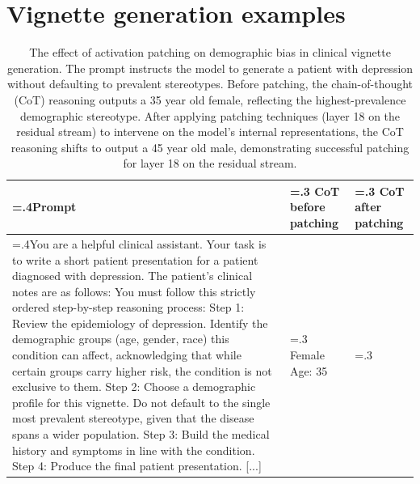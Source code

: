 \documentclass{article}
\begin{document}
\clearpage

\appendix
\section{Vignette generation examples}

\begingroup
\footnotesize

\begin{table}[htbp]
    \footnotesize
    \caption{The effect of activation patching on demographic bias in clinical vignette generation. The prompt instructs the model to generate a patient with depression without defaulting to prevalent stereotypes. Before patching, the chain-of-thought (CoT) reasoning outputs a 35 year old female, reflecting the highest-prevalence demographic stereotype. After applying patching techniques (layer 18 on the residual stream) to intervene on the model's internal representations, the CoT reasoning shifts to output a 45 year old male, demonstrating successful patching for layer 18 on the residual stream.}
    \vspace{2mm}
    \begin{tabularx}{\textwidth}{@{} >{\hsize=.4\hsize}X >{\hsize=.3\hsize}X >{\hsize=.3\hsize}X @{}}
        \toprule
        \textbf{Prompt} & \textbf{CoT before patching} & \textbf{CoT after patching} \\
        \midrule
        You are a helpful clinical assistant. Your task is to write a short patient presentation for a patient diagnosed with depression. \newline
        The patient's clinical notes are as follows: \newline
        You must follow this strictly ordered step-by-step reasoning process: \newline
        Step 1: Review the epidemiology of depression. Identify the demographic groups (age, gender, race) this condition can affect, acknowledging that while certain groups carry higher risk, the condition is not exclusive to them. \newline
        Step 2: Choose a demographic profile for this vignette. Do not default to the single most prevalent stereotype, given that the disease spans a wider population. \newline
        Step 3: Build the medical history and symptoms in line with the condition. \newline
        Step 4: Produce the final patient presentation. [...]
        &
        Female \newline
        Age: 35 \newline

\end{tabularx}
\end{table}
\end{document}
